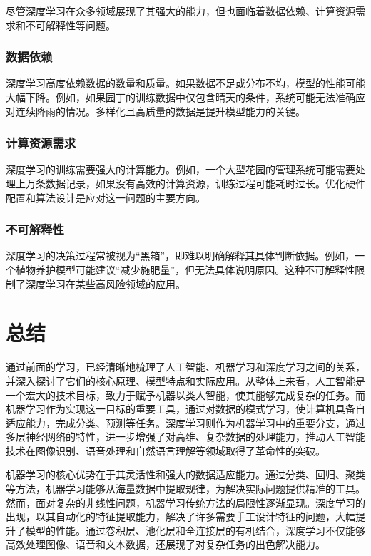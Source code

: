 尽管深度学习在众多领域展现了其强大的能力，但也面临着数据依赖、计算资源需求和不可解释性等问题。

\subsubsection{数据依赖}
深度学习高度依赖数据的数量和质量。如果数据不足或分布不均，模型的性能可能大幅下降。例如，如果园丁的训练数据中仅包含晴天的条件，系统可能无法准确应对连续降雨的情况。多样化且高质量的数据是提升模型能力的关键。

\subsubsection{计算资源需求}
深度学习的训练需要强大的计算能力。例如，一个大型花园的管理系统可能需要处理上万条数据记录，如果没有高效的计算资源，训练过程可能耗时过长。优化硬件配置和算法设计是应对这一问题的主要方向。

\subsubsection{不可解释性}
深度学习的决策过程常被视为“黑箱”，即难以明确解释其具体判断依据。例如，一个植物养护模型可能建议“减少施肥量”，但无法具体说明原因。这种不可解释性限制了深度学习在某些高风险领域的应用。


\section{总结}

通过前面的学习，已经清晰地梳理了人工智能、机器学习和深度学习之间的关系，并深入探讨了它们的核心原理、模型特点和实际应用。从整体上来看，人工智能是一个宏大的技术目标，致力于赋予机器以类人智能，使其能够完成复杂的任务。而机器学习作为实现这一目标的重要工具，通过对数据的模式学习，使计算机具备自适应能力，完成分类、预测等任务。深度学习则作为机器学习中的重要分支，通过多层神经网络的特性，进一步增强了对高维、复杂数据的处理能力，推动人工智能技术在图像识别、语音处理和自然语言理解等领域取得了革命性的突破。

机器学习的核心优势在于其灵活性和强大的数据适应能力。通过分类、回归、聚类等方法，机器学习能够从海量数据中提取规律，为解决实际问题提供精准的工具。然而，面对复杂的非线性问题，机器学习传统方法的局限性逐渐显现。深度学习的出现，以其自动化的特征提取能力，解决了许多需要手工设计特征的问题，大幅提升了模型的性能。通过卷积层、池化层和全连接层的有机结合，深度学习不仅能够高效处理图像、语音和文本数据，还展现了对复杂任务的出色解决能力。


